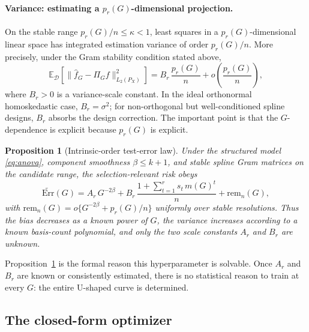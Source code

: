 \documentclass{article}
\newcommand{\EE}{\mathbb{E}}
\newcommand{\Err}{\mathrm{Err}}
\newtheorem{proposition}{Proposition}
\begin{document}
\paragraph{Variance: estimating a $p_r(G)$-dimensional projection.}
On the stable range $p_r(G)/n\le\kappa<1$, least squares in a $p_r(G)$-dimensional linear space has integrated estimation variance of order $p_r(G)/n$. More precisely, under the Gram stability condition stated above,
\begin{equation}
    \EE_{\mathcal{D}}\!\left[\|\hat f_G-\Pi_G f\|_{L_2(P_X)}^2\right]
    = B_r\,\frac{p_r(G)}{n}+o\!\left(\frac{p_r(G)}{n}\right),
    \label{eq:variance_proxy}
\end{equation}
where $B_r>0$ is a variance-scale constant. In the ideal orthonormal homoskedastic case, $B_r=\sigma^2$; for non-orthogonal but well-conditioned spline designs, $B_r$ absorbs the design correction. The important point is that the $G$-dependence is explicit because $p_r(G)$ is explicit.

\begin{proposition}[Intrinsic-order test-error law]
\label{prop:error_law}
Under the structured model \eqref{eq:anova}, component smoothness $\beta\le k+1$, and stable spline Gram matrices on the candidate range, the selection-relevant risk obeys
\begin{equation}
    \widetilde{\Err}(G)
    = A_r\,G^{-2\beta}
      + B_r\,\frac{1+\sum_{t=1}^{r}s_t\,m(G)^t}{n}
      + \mathrm{rem}_n(G),
    \label{eq:intrinsic_law}
\end{equation}
with $\mathrm{rem}_n(G)=o\{G^{-2\beta}+p_r(G)/n\}$ uniformly over stable resolutions. Thus the bias decreases as a known power of $G$, the variance increases according to a known basis-count polynomial, and only the two scale constants $A_r$ and $B_r$ are unknown.
\end{proposition}

Proposition~\ref{prop:error_law} is the formal reason this hyperparameter is solvable. Once $A_r$ and $B_r$ are known or consistently estimated, there is no statistical reason to train at every $G$: the entire U-shaped curve is determined.

\subsection{The closed-form optimizer}
\label{sec:effective_density}
\end{document}
